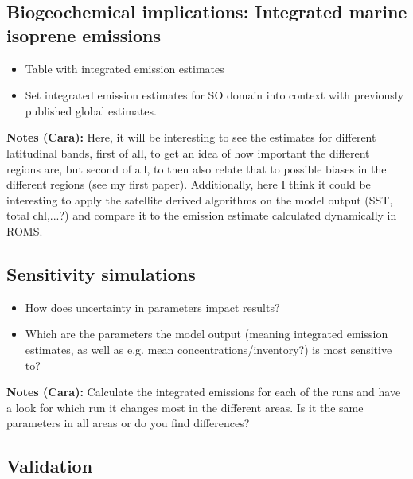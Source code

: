\documentclass[draft,linenumbers]{agujournal}
\begin{document}
\subsection{Biogeochemical implications: Integrated marine isoprene emissions}
\begin{itemize}
\item Table with integrated emission estimates
\item Set integrated emission estimates for SO domain into context with previously published global estimates. 
\end{itemize}
\textbf{Notes (Cara):}
Here, it will be interesting to see the estimates for different latitudinal bands, first of all, to get an idea of how important the different regions are, but second of all, to then also relate that to possible biases in the different regions (see my first paper).
Additionally, here I think it could be interesting to apply the satellite derived algorithms on the model output (SST, total chl,...?) and compare it to the emission estimate calculated dynamically in ROMS. 

\subsection{Sensitivity simulations}
\begin{itemize}
\item How does uncertainty in parameters impact results?
\item Which are the parameters the model output (meaning integrated emission estimates, as well as e.g. mean concentrations/inventory?) is most sensitive to?
\end{itemize}
\textbf{Notes (Cara):}
Calculate the integrated emissions for each of the runs and have a look for which run it changes most in the different areas. Is it the same parameters in all areas or do you find differences? 

\subsection{Validation}
\end{document}
